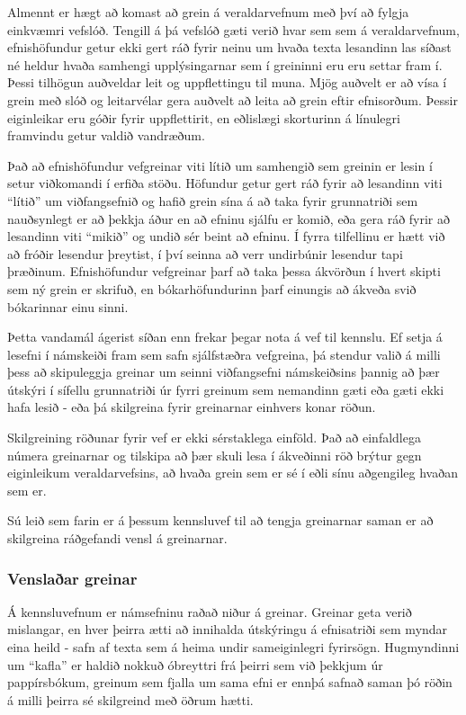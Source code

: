 \documentclass[a4paper,12pt,twoside,BCOR=10mm]{scrbook}
\begin{document}
Almennt er hægt að komast að grein á veraldarvefnum með því að fylgja einkvæmri vefslóð. Tengill á þá vefslóð gæti verið hvar sem sem á veraldarvefnum, efnishöfundur getur ekki gert ráð fyrir neinu um hvaða texta lesandinn las síðast né heldur hvaða samhengi upplýsingarnar sem í greininni eru eru settar fram í. Þessi tilhögun auðveldar leit og uppflettingu til muna. Mjög auðvelt er að vísa í grein með slóð og leitarvélar gera auðvelt að leita að grein eftir efnisorðum. Þessir eiginleikar eru góðir fyrir uppflettirit, en eðlislægi skorturinn á línulegri framvindu getur valdið vandræðum.

Það að efnishöfundur vefgreinar viti lítið um samhengið sem greinin er lesin í setur viðkomandi í erfiða stöðu. Höfundur getur gert ráð fyrir að lesandinn viti ``lítið'' um viðfangsefnið og hafið grein sína á að taka fyrir grunnatriði sem nauðsynlegt er að þekkja áður en að efninu sjálfu er komið, eða gera ráð fyrir að lesandinn viti ``mikið'' og undið sér beint að efninu. Í fyrra tilfellinu er hætt við að fróðir lesendur þreytist, í því seinna að verr undirbúnir lesendur tapi þræðinum. Efnishöfundur vefgreinar þarf að taka þessa ákvörðun í hvert skipti sem ný grein er skrifuð, en bókarhöfundurinn þarf einungis að ákveða svið bókarinnar einu sinni.

Þetta vandamál ágerist síðan enn frekar þegar nota á vef til kennslu. Ef setja á lesefni í námskeiði fram sem safn sjálfstæðra vefgreina, þá stendur valið á milli þess að skipuleggja greinar um seinni viðfangsefni námskeiðsins þannig að þær útskýri í sífellu grunnatriði úr fyrri greinum sem nemandinn gæti eða gæti ekki hafa lesið - eða þá skilgreina fyrir greinarnar einhvers konar röðun.

Skilgreining röðunar fyrir vef er ekki sérstaklega einföld. Það að einfaldlega númera greinarnar og tilskipa að þær skuli lesa í ákveðinni röð brýtur gegn eiginleikum veraldarvefsins, að hvaða grein sem er sé í eðli sínu aðgengileg hvaðan sem er. 

Sú leið sem farin er á þessum kennsluvef til að tengja greinarnar saman er að skilgreina ráðgefandi vensl á greinarnar.
\subsubsection{Venslaðar greinar}
Á kennsluvefnum er námsefninu raðað niður á greinar. Greinar geta verið mislangar, en hver þeirra ætti að innihalda útskýringu á efnisatriði sem myndar eina heild - safn af texta sem á heima undir sameiginlegri fyrirsögn. Hugmyndinni um ``kafla'' er haldið nokkuð óbreyttri frá þeirri sem við þekkjum úr pappírsbókum, greinum sem fjalla um sama efni er ennþá safnað saman þó röðin á milli þeirra sé skilgreind með öðrum hætti.
\end{document}
